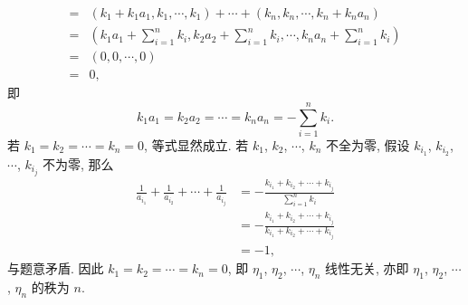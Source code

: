 \documentclass[a4paper, 11pt]{ctexart}
\begin{document}
\begin{enumerate}
\begin{align*}
                ={} & (k_1 + k_1a_1, k_1, \cdots, k_1) + \cdots + (k_n, k_n, \cdots, k_n + k_na_n) \\
                ={} & \left(k_1a_1 + \sum_{i=1}^nk_i, k_2a_2 + \sum_{i=1}^nk_i, \cdots, k_na_n + \sum_{i=1}^nk_i\right) \\
                ={} & (0, 0, \cdots, 0) \\
                ={} & 0,
            \end{align*}
            即
            \[
                k_1a_1 = k_2a_2 = \cdots = k_na_n = -\sum_{i=1}^nk_i.    
            \]
            若 $k_1 = k_2 = \cdots = k_n = 0$, 等式显然成立. 若 $k_1$, $k_2$, $\cdots$, $k_n$ 不全为零, 假设 $k_{i_1}$, $k_{i_2}$, $\cdots$, $k_{i_j}$ 不为零, 那么
            \begin{align*}
                \frac{1}{a_{i_1}} + \frac{1}{a_{i_2}} + \cdots + \frac{1}{a_{i_j}} &= -\frac{k_{i_1} + k_{i_2} + \cdots + k_{i_j}}{\displaystyle{\sum_{i=1}^nk_i}} \\
                                                                                   &= -\frac{k_{i_1} + k_{i_2} + \cdots + k_{i_j}}{k_{i_1} + k_{i_2} + \cdots + k_{i_j}} \\
                                                                                   &= -1,
            \end{align*}
            与题意矛盾. 因此 $k_1 = k_2 = \cdots = k_n = 0$, 即 $\eta_1$, $\eta_2$, $\cdots$, $\eta_n$ 线性无关, 亦即 $\eta_1$, $\eta_2$, $\cdots$, $\eta_n$ 的秩为 $n$.
    \end{enumerate}
\end{document}
